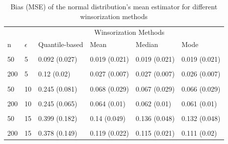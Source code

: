 \documentclass[
]{article}
\begin{document}
\begin{CodeChunk}
\begin{table}[H]

\caption{\label{tab:unnamed-chunk-4}Bias (MSE) of the normal distribution's mean estimator for different winsorization methods}
\centering
\begin{tabular}[t]{l|l|l|l|l|l}
\hline
\multicolumn{2}{c|}{ } & \multicolumn{4}{c}{Winsorization Methods} \\
\cline{3-6}
n & $\epsilon$ & Quantile-based & Mean & Median & Mode\\
\hline
\cellcolor{gray!6}{20} & \cellcolor{gray!6}{5} & \cellcolor{gray!6}{0.111 (0.06)} & \cellcolor{gray!6}{0.021 (0.058)} & \cellcolor{gray!6}{0.02 (0.058)} & \cellcolor{gray!6}{0.02 (0.058)}\\
\hline
50 & 5 & 0.092 (0.027) & 0.019 (0.021) & 0.019 (0.021) & 0.019 (0.021)\\
\hline
\cellcolor{gray!6}{100} & \cellcolor{gray!6}{5} & \cellcolor{gray!6}{0.122 (0.025)} & \cellcolor{gray!6}{0.029 (0.012)} & \cellcolor{gray!6}{0.029 (0.012)} & \cellcolor{gray!6}{0.028 (0.012)}\\
\hline
200 & 5 & 0.12 (0.02) & 0.027 (0.007) & 0.027 (0.007) & 0.026 (0.007)\\
\hline
\cellcolor{gray!6}{20} & \cellcolor{gray!6}{10} & \cellcolor{gray!6}{0.24 (0.111)} & \cellcolor{gray!6}{0.074 (0.068)} & \cellcolor{gray!6}{0.074 (0.068)} & \cellcolor{gray!6}{0.074 (0.069)}\\
\hline
50 & 10 & 0.245 (0.081) & 0.068 (0.029) & 0.067 (0.029) & 0.066 (0.029)\\
\hline
\cellcolor{gray!6}{100} & \cellcolor{gray!6}{10} & \cellcolor{gray!6}{0.244 (0.07)} & \cellcolor{gray!6}{0.068 (0.017)} & \cellcolor{gray!6}{0.066 (0.017)} & \cellcolor{gray!6}{0.065 (0.017)}\\
\hline
200 & 10 & 0.245 (0.065) & 0.064 (0.01) & 0.062 (0.01) & 0.061 (0.01)\\
\hline
\cellcolor{gray!6}{20} & \cellcolor{gray!6}{15} & \cellcolor{gray!6}{0.353 (0.18)} & \cellcolor{gray!6}{0.113 (0.08)} & \cellcolor{gray!6}{0.111 (0.08)} & \cellcolor{gray!6}{0.108 (0.082)}\\
\hline
50 & 15 & 0.399 (0.182) & 0.14 (0.049) & 0.136 (0.048) & 0.132 (0.048)\\
\hline
\cellcolor{gray!6}{100} & \cellcolor{gray!6}{15} & \cellcolor{gray!6}{0.378 (0.154)} & \cellcolor{gray!6}{0.121 (0.028)} & \cellcolor{gray!6}{0.117 (0.027)} & \cellcolor{gray!6}{0.113 (0.026)}\\
\hline
200 & 15 & 0.378 (0.149) & 0.119 (0.022) & 0.115 (0.021) & 0.111 (0.02)\\
\hline
\end{tabular}
\end{table}

\end{CodeChunk}
\end{document}
